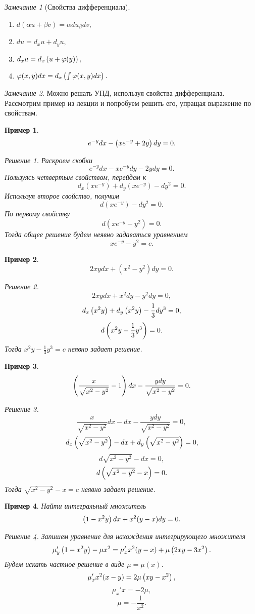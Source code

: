 \documentclass[a5paper, 11pt]{article}
\theoremstyle{definition}
\theoremstyle{plain}
\newtheorem{Ex}{Пример}
\theoremstyle{remark}
\newtheorem*{Note}{Замечание}
\newtheorem*{Solution}{Решение}
\begin{document}
	\begin{Note}[Свойства дифференциала]			
		\hspace{0pt}
		\begin{enumerate}
			\item $
			d(\alpha u+\beta v) = \alpha du _ \beta dv,
			$
			\item $
			du = d_x u + d_y u,
			$
			\item $
			d_x u = d_x \left(u+\varphi(y)\right),
			$
			\item $
			\varphi(x,y)dx = d_x \left(\int\varphi(x,y)dx\right).
			$
		\end{enumerate}
	\end{Note}
	\begin{Note}
		Можно решать УПД, используя свойства дифференциала. Рассмотрим пример из лекции и попробуем решить его, упращая выражение по свойствам.
	\end{Note}
	\begin{Ex}
		\[
		e^{-y}dx - \left(xe^{-y} + 2y\right) dy = 0.
		\]
		\begin{Solution}
		Раскроем скобки
		\[
		e^{-y}dx - xe^{-y} dy - 2y dy = 0.
		\]
		Пользуясь четвертым свойством, перейдем к 
		\[
		d_x(xe^{-y}) + d_y(xe^{-y}) - dy^2 = 0.
		\]
		Используя второе свойство, получим
		\[
		d(xe^{-y})-dy^2 = 0.
		\]
		По первому свойству
		\[
		d(xe^{-y}-y^2) = 0.
		\]
		Тогда общее решение будем неявно задаваться уравнением 
		\[
		xe^{-y}-y^2 = c.
		\]
	\end{Solution}
	\end{Ex}
	\begin{Ex}
		\[
		2xydx+(x^2-y^2)dy=0.
		\]
		\begin{Solution}
			\[
			2xydx+x^2dy-y^2dy=0,
			\]
			\[
			d_x\left(x^2y\right) + d_y\left(x^2y\right) - \frac13 dy^3 = 0,
			\]
			\[
			d\left(x^2y-\frac13 y^3\right) = 0.
			\]
			Тогда $x^2y-\frac13 y^3 = c$ неявно задает решение.
		\end{Solution}
	\end{Ex}
	\begin{Ex}
		\[
			\left(\frac{x}{\sqrt{x^2-y^2}}-1\right)dx - \frac{ydy}{\sqrt{x^2-y^2}} = 0.
		\]
		\begin{Solution}
		\[
			\frac{x}{\sqrt{x^2-y^2}}dx-dx - \frac{ydy}{\sqrt{x^2-y^2}} = 0,
		\]
		\[
		d_x\left(\sqrt{x^2-y^2}\right) - dx + d_y\left(\sqrt{x^2-y^2}\right) = 0, 
		\]
		\[
		d \sqrt{x^2-y^2} - dx = 0,
		\]
		\[
		d\left(\sqrt{x^2-y^2}-x\right) = 0.
		\]
		Тогда $\sqrt{x^2-y^2}-x = c$ неявно задает решение.
		\end{Solution}
	\end{Ex}
	\begin{Ex}
		Найти интегральный множитель
		\[
		\left(1-x^2y\right)dx + x^2(y-x)dy = 0.
		\]
		\begin{Solution}
			Запишем уравнение для нахождения интегрирующего множителя
			\[
			\mu_y' 	\left(1-x^2y\right) - \mu x^2 = \mu_x'x^2(y-x)  + \mu \left(2xy-3x^2\right).
			\]
			Будем искать частное решение в виде $\mu = \mu(x)$.
			\[
			\mu_x'x^2(x-y) = 2\mu \left(xy-x^2\right),
			\]
			\[
			\mu_x' x = -2 \mu,
			\]
			\[
			\mu = -\frac1{x^2}.
			\]
		\end{Solution}
	\end{Ex}
	
\end{document}
